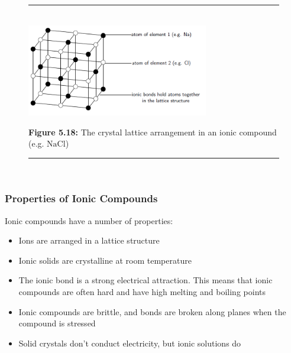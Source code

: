 	\begin{figure}[H] %
    \begin{center}
    \rule[.1in]{\figurerulewidth}{.005in} \\
        \label{m38684*uid70!!!underscore!!!media}\label{m38684*uid70!!!underscore!!!printimage}\includegraphics[width=300px]{col11305.imgs/m38684_CG11C1_021.png} %
        
      \vspace{2pt}
    \vspace{\rubberspace}\par \begin{cnxcaption}
	  \small \textbf{Figure 5.18: }The crystal lattice arrangement in an ionic compound (e.g. \begin{math}\mathrm{NaCl}\end{math})
	\end{cnxcaption}
      
    \vspace{.1in}
    \rule[.1in]{\figurerulewidth}{.005in} \\
        
    \end{center}

 \end{figure}   

    \addtocounter{footnote}{-0}
    
      
      \label{m38684*uid71}
            \subsubsection{ Properties of Ionic Compounds}
            \nopagebreak
            
        
        \label{m38684*id142811}Ionic compounds have a number of properties:\par 
        \label{m38684*id142815}\begin{itemize}[noitemsep]
            \label{m38684*uid72}\item Ions are arranged in a lattice structure
\label{m38684*uid73}\item Ionic solids are crystalline at room temperature
\label{m38684*uid74}\item The ionic bond is a strong electrical attraction. This means that ionic compounds are often hard and have high melting and boiling points
\label{m38684*uid75}\item Ionic compounds are brittle, and bonds are broken along planes when the compound is stressed
\label{m38684*uid76}\item Solid crystals don't conduct electricity, but ionic solutions do
\end{itemize}
        
